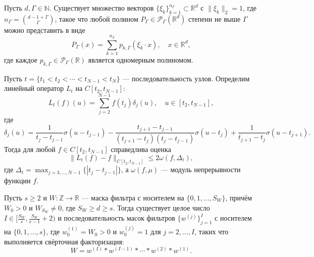 \documentclass[../NDCNNAI_main.tex]{subfiles}
\begin{document}
\begin{lemma}
\label{lem:poly_decomp}
Пусть $d, \Gamma \in \mathbb{N}$. Существует множество векторов $\{\xi_k\}_{k=1}^{n_\Gamma} \subset \mathbb{R}^d$ с $\|\xi_k\|_2 = 1$, где $n_\Gamma = \binom{d-1+\Gamma}{\Gamma}$, такое что любой полином $P_\Gamma \in \mathcal{P}_\Gamma(\mathbb{R}^d)$ степени не выше $\Gamma$ можно представить в виде
\[
P_\Gamma(x) = \sum_{k=1}^{n_\Gamma} p_{k,\Gamma}(\xi_k \cdot x), \quad x \in \mathbb{R}^d,
\]
где каждое $p_{k,\Gamma} \in \mathcal{P}_\Gamma(\mathbb{R})$ является одномерным полиномом.
\end{lemma}

\begin{lemma}
\label{lem:spline_approx}
Пусть $t = \{t_1 < t_2 < \cdots < t_{N-1} < t_N\}$ --- последовательность узлов. Определим линейный оператор $L_t$ на $C[t_2, t_{N-1}]$:
\[
L_t(f)(u) = \sum_{j=2}^{N-1} f(t_j) \delta_j(u), \quad u \in [t_2, t_{N-1}],
\]
где
\[
\delta_j(u) = \frac{1}{t_j - t_{j-1}} \sigma(u - t_{j-1}) - \frac{t_{j+1} - t_{j-1}}{(t_{j+1} - t_j)(t_j - t_{j-1})} \sigma(u - t_j) + \frac{1}{t_{j+1} - t_j} \sigma(u - t_{j+1}).
\]
Тогда для любой $f \in C[t_2, t_{N-1}]$ справедлива оценка
\[
\|L_t(f) - f\|_{C[t_2, t_{N-1}]} \leq 2 \omega(f, \Delta_t),
\]
где $\Delta_t = \max_{j=3,\ldots,N-1} \{|t_j - t_{j-1}|\}$, а $\omega(f, \mu)$ --- модуль непрерывности функции $f$.
\end{lemma}

\begin{lemma}
\label{lem:filter_factorization}
Пусть $s \geq 2$ и $W: \mathbb{Z} \to \mathbb{R}$ --- маска фильтра с носителем на $\{0, 1, \ldots, S_W\}$, причём $W_0 > 0$ и $W_{S_W} \neq 0$, где $S_W \geq d \geq s$. Тогда существует целое число $I \in [\frac{S_W}{s}, \frac{S_W}{s-1} + 2)$ и последовательность масок фильтров $\{w^{(j)}\}_{j=1}^I$ с носителем на $\{0, 1, \ldots, s\}$, где $w_0^{(1)} = W_0 > 0$ и $w_0^{(j)} = 1$ для $j = 2, \ldots, I$, таких что выполняется свёрточная факторизация:
\[
W = w^{(I)} * w^{(I-1)} * \cdots * w^{(2)} * w^{(1)}.
\]
\end{lemma}
\end{document}
